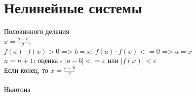 \documentclass{article}
\begin{document}
\section{Нелинейные системы}
Половинного деления\\
$x = \frac{a+b}{2}$; \\
$f(a)\cdot f(x)>0$ => $b=x$; $f(a)\cdot f(x)<=0$ => $a=x$\\
$n=n+1$; оценка - $|a-b|<=\varepsilon$ или $|f(x)|<\varepsilon$\\
Если конец, то $x = \frac{a+b}{2}$
\\ \\
Ньютона\\
\end{document}
